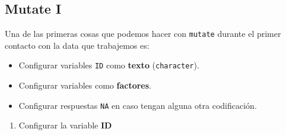 \documentclass[
]{book}
\providecommand{\tightlist}{%
  \setlength{\itemsep}{0pt}\setlength{\parskip}{0pt}}
\begin{document}
\hypertarget{mutate-i}{%
\subsection{Mutate I}\label{mutate-i}}

Una de las primeras cosas que podemos hacer con \texttt{mutate} durante el primer contacto con la data que trabajemos es:

\begin{itemize}
\item
  Configurar variables \texttt{ID} como \textbf{texto} (\texttt{character}).
\item
  Configurar variables como \textbf{factores}.
\item
  Configurar respuestas \texttt{NA} en caso tengan alguna otra codificación.
\end{itemize}

\begin{enumerate}
\def\labelenumi{\arabic{enumi}.}
\tightlist
\item
  Configurar la variable \textbf{ID}
\end{enumerate}
\end{document}
